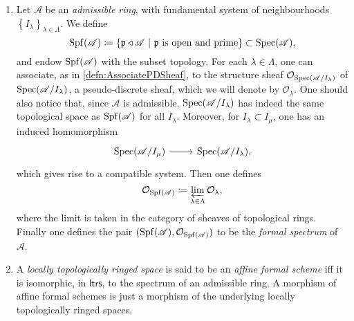 \begin{defn}\leavevmode\vspace{-\baselineskip}
\begin{enumerate}
\item Let $\mathscr{A}$ be an \emph{admissible ring}, with fundamental system of
	neighbourhoods $\left\{ I_\lambda \right\}_{\lambda \in \Lambda}$.
	We define
	\begin{equation*}
	\spf(\mathscr{A}) \coloneqq
	\left\{ \mathfrak{p} \triangleleft \mathscr{A} \ \middle|\ \mathfrak{p}
	\text{ is open and prime} \right\} \subset \spec(\mathscr{A})
	,\end{equation*}
	and endow $\operatorname{Spf}(\mathscr{A})$ with the subset topology.
	For each $\lambda \in \Lambda$, one can associate,
	as in \cref{defn:AssociatePDSheaf},
	to the structure sheaf $\mathcal{O}_{\operatorname{Spec}(\mathscr{A}/I_\lambda)}$
	of $\operatorname{Spec}(\mathscr{A}/I_\lambda)$,
	a pseudo-discrete sheaf, which we will denote by $\mathcal{O}_\lambda$.
	One should also notice that, since $\mathscr{A}$ is admissible,
	$\operatorname{Spec}(\mathscr{A}/I_\lambda)$ has indeed the same topological space
	as $\operatorname{Spf}(\mathscr{A})$ for all $I_\lambda$.
	Moreover, for $I_\lambda \subset I_\mu$, one has an induced homomorphism
	\begin{equation*}
	\begin{tikzcd}[row sep = 0ex
		,/tikz/column 1/.append style={anchor=base east}
		,/tikz/column 2/.append style={anchor=base west}]
		\spec(\mathscr{A}/I_\mu) \arrow[r, "", rightarrow] &
		\spec(\mathscr{A}/I_\lambda)
	,\end{tikzcd}
	\end{equation*} 
	which gives rise to a compatible system.
	Then one defines
	\begin{equation*}
	\mathcal{O}_{\operatorname{Spf}(\mathscr{A})} \coloneqq
	\varprojlim_{\lambda \in \Lambda} \mathcal{O}_\lambda
	,\end{equation*}
	where the limit is taken in the category of sheaves of topological rings.
	Finally one defines the pair $( \operatorname{Spf}(\mathscr{A}) , \mathcal{O}_{ \operatorname{Spf}(\mathscr{A}) } )$
	to be the \emph{formal spectrum} of $\mathscr{A}$.

\item A \emph{locally topologically ringed space} is said to be an 
	\emph{affine formal scheme} iff it is isomorphic,
	in \(\mathsf{ltrs}\), to the spectrum of an admissible ring.
	A morphism of affine formal schemes is just a morphism of the underlying
	locally topologically ringed spaces.
\end{enumerate}
\end{defn}


